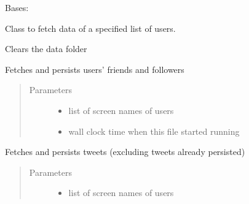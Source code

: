 \documentclass[letterpaper,10pt,english]{sphinxmanual}
\begin{document}
\begin{fulllineitems}
\label{\detokenize{twitter_stream:userstimeline.UserTimelineAPI}}
Bases: 

Class to fetch data of a specified list of users.

\begin{fulllineitems}
\label{\detokenize{twitter_stream:userstimeline.UserTimelineAPI.clear_everyting}}
Clears the data folder

\end{fulllineitems}


\begin{fulllineitems}
\label{\detokenize{twitter_stream:userstimeline.UserTimelineAPI.fetch_persist_friends_and_followers}}
Fetches and persists users’ friends and followers
\begin{quote}\begin{description}
\item[{Parameters}] \leavevmode\begin{itemize}
\item {} 
 \textendash{} list of screen names of users

\item {} 
 \textendash{} wall clock time when this file started running

\end{itemize}

\end{description}\end{quote}

\end{fulllineitems}


\begin{fulllineitems}
\label{\detokenize{twitter_stream:userstimeline.UserTimelineAPI.fetch_persist_tweets}}
Fetches and persists tweets (excluding tweets already persisted)
\begin{quote}\begin{description}
\item[{Parameters}] \leavevmode\begin{itemize}
\item {} 
 \textendash{} list of screen names of users


\end{itemize}
\end{description}
\end{quote}
\end{fulllineitems}
\end{fulllineitems}
\end{document}
